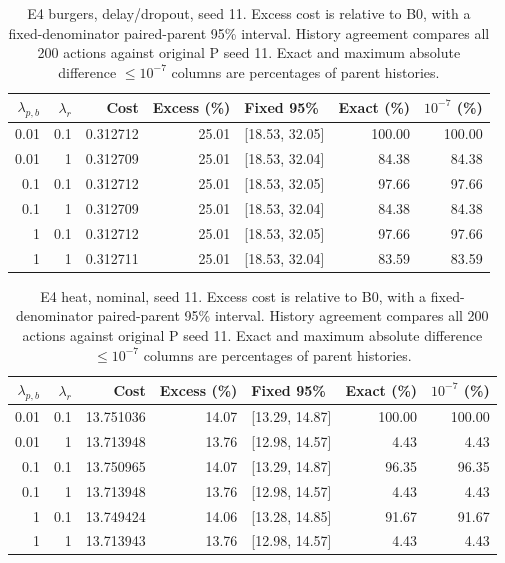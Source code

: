 \begin{table}[ht]
\centering\small
\caption{E4 burgers, delay/dropout, seed 11. Excess cost is relative to B0, with a fixed-denominator paired-parent 95\% interval. History agreement compares all 200 actions against original P seed 11. Exact and maximum absolute difference $\leq10^{-7}$ columns are percentages of parent histories.}\label{tab:weights_control_burgers_locked_delay_dropout}
\begin{tabular}{@{}rrrrlrr@{}}\toprule
$\lambda_{p,b}$ & $\lambda_r$ & Cost & Excess (\%) & Fixed 95\% & Exact (\%) & $10^{-7}$ (\%)\\\midrule
0.01 & 0.1 & 0.312712 & 25.01 & [18.53, 32.05] & 100.00 & 100.00\\
0.01 & 1 & 0.312709 & 25.01 & [18.53, 32.04] & 84.38 & 84.38\\
0.1 & 0.1 & 0.312712 & 25.01 & [18.53, 32.05] & 97.66 & 97.66\\
0.1 & 1 & 0.312709 & 25.01 & [18.53, 32.04] & 84.38 & 84.38\\
1 & 0.1 & 0.312712 & 25.01 & [18.53, 32.05] & 97.66 & 97.66\\
1 & 1 & 0.312711 & 25.01 & [18.53, 32.04] & 83.59 & 83.59\\
\bottomrule\end{tabular}
\end{table}

\begin{table}[ht]
\centering\small
\caption{E4 heat, nominal, seed 11. Excess cost is relative to B0, with a fixed-denominator paired-parent 95\% interval. History agreement compares all 200 actions against original P seed 11. Exact and maximum absolute difference $\leq10^{-7}$ columns are percentages of parent histories.}\label{tab:weights_control_heat_locked_nominal}
\begin{tabular}{@{}rrrrlrr@{}}\toprule
$\lambda_{p,b}$ & $\lambda_r$ & Cost & Excess (\%) & Fixed 95\% & Exact (\%) & $10^{-7}$ (\%)\\\midrule
0.01 & 0.1 & 13.751036 & 14.07 & [13.29, 14.87] & 100.00 & 100.00\\
0.01 & 1 & 13.713948 & 13.76 & [12.98, 14.57] & 4.43 & 4.43\\
0.1 & 0.1 & 13.750965 & 14.07 & [13.29, 14.87] & 96.35 & 96.35\\
0.1 & 1 & 13.713948 & 13.76 & [12.98, 14.57] & 4.43 & 4.43\\
1 & 0.1 & 13.749424 & 14.06 & [13.28, 14.85] & 91.67 & 91.67\\
1 & 1 & 13.713943 & 13.76 & [12.98, 14.57] & 4.43 & 4.43\\
\bottomrule\end{tabular}
\end{table}

